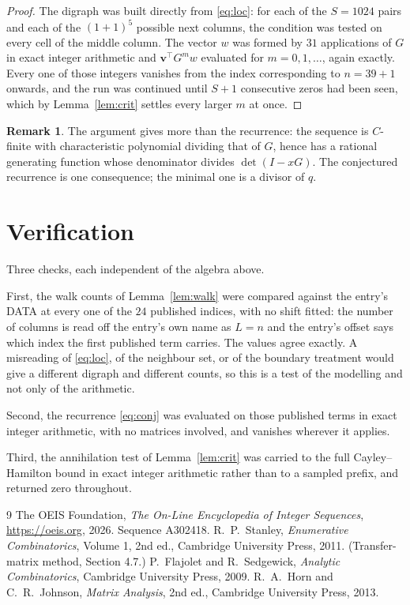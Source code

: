 \documentclass[11pt,a4paper]{article}
\theoremstyle{plain}
\theoremstyle{definition}
\newtheorem{remark}[theorem]{Remark}
\begin{document}
\begin{proof}
The digraph was built directly from \eqref{eq:loc}: for each of the $S=1024$ pairs and each
of the $(1+1)^{5}$ possible next columns, the condition was tested on every cell of
the middle column. The vector $w$ was formed by $31$ applications of $G$ in exact integer
arithmetic and $\mathbf{v}^{\!\top}G^{m}w$ evaluated for $m=0,1,\dots$, again exactly.
Every one of those integers vanishes from the index corresponding to $n=39+1$ onwards,
and the run was continued until $S+1$ consecutive zeros had been seen, which by
Lemma~\ref{lem:crit} settles every larger $m$ at once.
\end{proof}

\begin{remark}
The argument gives more than the recurrence: the sequence is $C$-finite with characteristic
polynomial dividing that of $G$, hence has a rational generating function whose denominator
divides $\det(I-xG)$. The conjectured recurrence is one consequence; the minimal one is a
divisor of $q$.
\end{remark}

\section{Verification}

Three checks, each independent of the algebra above.

First, the walk counts of Lemma~\ref{lem:walk} were compared against the entry's DATA at
every one of the $24$ published indices, with no shift fitted: the number of columns is
read off the entry's own name as $L=n$ and the entry's offset says which index the first
published term carries. The values agree exactly. A misreading of \eqref{eq:loc}, of the
neighbour set, or of the boundary treatment would give a different digraph and different
counts, so this is a test of the modelling and not only of the arithmetic.

Second, the recurrence \eqref{eq:conj} was evaluated on those published terms in exact
integer arithmetic, with no matrices involved, and vanishes wherever it applies.

Third, the annihilation test of Lemma~\ref{lem:crit} was carried to the full
Cayley--Hamilton bound in exact integer arithmetic rather than to a sampled prefix, and
returned zero throughout.

\begin{thebibliography}{9}
 The OEIS Foundation, \emph{The On-Line Encyclopedia of Integer
Sequences}, \url{https://oeis.org}, 2026. Sequence A302418.
 R.~P.~Stanley, \emph{Enumerative Combinatorics}, Volume 1, 2nd ed.,
Cambridge University Press, 2011. (Transfer-matrix method, Section 4.7.)
 P.~Flajolet and R.~Sedgewick, \emph{Analytic Combinatorics}, Cambridge
University Press, 2009.
 R.~A.~Horn and C.~R.~Johnson, \emph{Matrix Analysis}, 2nd ed., Cambridge
University Press, 2013.
\end{thebibliography}
\end{document}
